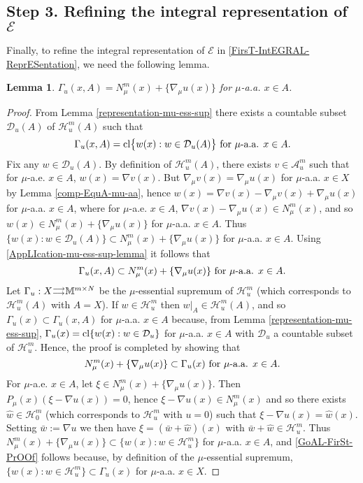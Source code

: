 \documentclass[10pt]{amsart}
\numberwithin{equation}{section}
\newtheorem{lemma}[theorem]{Lemma}
\theoremstyle{definition}
\theoremstyle{remark}
\begin{document}
\subsection*{Step 3. Refining the integral representation of \boldmath$\mathcal{E}$\unboldmath} Finally, to refine the integral representation of $\mathcal{E}$ in \eqref{FirsT-IntEGRAL-ReprESentation}, we need the following lemma.

\begin{lemma}
$\Gamma_u(x,A)=N^m_\mu(x)+\{\nabla_\mu u(x)\}$ for $\mu$-a.a. $x\in A$.
\end{lemma}
\begin{proof}
From Lemma \ref{representation-mu-ess-sup} there exists a countable subset $\mathcal{D}_u(A)$ of $\mathcal{H}_u^m(A)$ such that 
\begin{equation}\label{AppLIcation-mu-ess-sup-lemma}
\Gamma_u(x,A)={\rm cl}\big\{w(x):w\in\mathcal{D}_u(A)\big\}\hbox{ for $\mu$-a.a. $x\in A$.}
\end{equation}
Fix any $w\in\mathcal{D}_u(A)$. By definition of $\mathcal{H}^m_u(A)$, there exists $v\in\mathcal{A}^m_u$ such that for $\mu$-a.e. $x\in A$, $w(x)=\nabla v(x)$. But $\nabla_\mu v(x)=\nabla_\mu u(x)$ for $\mu$-a.a. $x\in X$ by Lemma \ref{comp-EquA-mu-aa}, hence $w(x)=\nabla v(x)-\nabla_\mu v(x)+\nabla_\mu u(x)$ for $\mu$-a.a. $x\in A$, where for $\mu$-a.e. $x\in A$, $\nabla v(x)-\nabla_\mu u(x)\in N^m_\mu(x)$, and so $w(x)\in N_\mu^m(x)+\{\nabla_\mu u(x)\}$ for $\mu$-a.a. $x\in A$. Thus $\{w(x):w\in\mathcal{D}_u(A)\}\subset N^m_\mu(x)+\{\nabla_\mu u(x)\}$ for $\mu$-a.a. $x\in A$. Using \eqref{AppLIcation-mu-ess-sup-lemma} it follows that 
$$
\Gamma_u(x,A)\subset N^m_\mu(x)+\{\nabla_\mu u(x)\}\hbox{ for $\mu$-a.a. $x\in A$.}
$$
Let $\Gamma_u:X{{\scriptstyle\buildrel{\scriptstyle\longrightarrow}
\over{{}_{\scriptstyle\longrightarrow}}}}{{\mathbb M}^{m\times N}}$ be the $\mu$-essential supremum of $\mathcal{H}^m_u$ (which corresponds to $\mathcal{H}^m_u(A)$ with $A=X$). If $w\in\mathcal{H}^m_u$ then $w|_A\in\mathcal{H}^m_u(A)$, and so $\Gamma_u(x)\subset\Gamma_u(x,A)$ for $\mu$-a.a. $x\in A$ because, from Lemma \ref{representation-mu-ess-sup}, $\Gamma_u(x)={\rm cl}\{w(x):w\in\mathcal{D}_u\}$ for $\mu$-a.a. $x\in A$ with $\mathcal{D}_u$ a countable subset of $\mathcal{H}^m_u$. Hence, the proof is completed by showing that
\begin{equation}\label{GoAL-FirSt-PrOOf}
N^m_\mu(x)+\{\nabla_\mu u(x)\}\subset \Gamma_u(x)\hbox{ for $\mu$-a.a. $x\in A$.}
\end{equation}
For $\mu$-a.e. $x\in A$, let $\xi\in N^m_\mu(x)+\{\nabla_\mu u(x)\}$. Then $P_\mu(x)(\xi-\nabla u(x))=0$, hence $\xi-\nabla u(x)\in N^m_\mu(x)$ and so there exists $\hat w\in\mathcal{H}^m_0$ (which corresponds to $\mathcal{H}^m_u$ with $u=0$) such that  $\xi-\nabla u(x)=\hat w(x)$. Setting $\bar w:=\nabla u$ we then have $\xi=(\bar w+\hat w)(x)$ with $\bar w+\hat w\in\mathcal{H}^m_u$. Thus $N^m_\mu(x)+\{\nabla_\mu u(x)\}\subset\{w(x):w\in\mathcal{H}^m_u\}$ for $\mu$-a.a. $x\in A$, and \eqref{GoAL-FirSt-PrOOf} follows because, by definition of the $\mu$-essential supremum, $\{w(x):w\in\mathcal{H}^m_u\}\subset\Gamma_u(x)$ for $\mu$-a.a. $x\in X$.
\end{proof}
\end{document}
